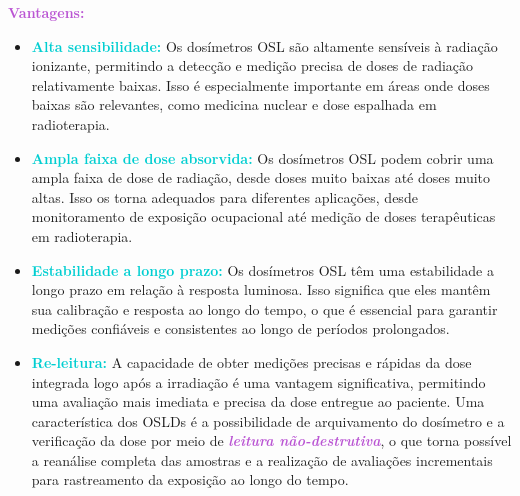 \documentclass[11pt,a4paper]{article}
\begin{document}
	\begin{tcolorbox}[width=\textwidth, colback={white}, colbacktitle={DarkTurquoise!50!white}, title={$\bigstar$ \LobsterTwo{Dosímetros OSL} $\bigstar$}, coltitle={CarnationPink}, colframe={DarkTurquoise}, fonttitle=\rmfamily\bfseries\Large, breakable]

	\textcolor{MediumOrchid}{\Large\LobsterTwo\textbf{Vantagens:}}
	\begin{itemize}[label=\textcolor{CarnationPink}{$\blacktriangleright$}]
		\item \textcolor{DarkTurquoise}{\textbf{Alta sensibilidade:}} Os dosímetros OSL são altamente sensíveis à radiação ionizante, permitindo a detecção e medição precisa de doses de radiação relativamente baixas. Isso é especialmente importante em áreas onde doses baixas são relevantes, como medicina nuclear e dose espalhada em radioterapia.
		\item \textcolor{DarkTurquoise}{\textbf{Ampla faixa de dose absorvida:}} Os dosímetros OSL podem cobrir uma ampla faixa de dose de radiação, desde doses muito baixas até doses muito altas. Isso os torna adequados para diferentes aplicações, desde monitoramento de exposição ocupacional até medição de doses terapêuticas em radioterapia.
		\item \textcolor{DarkTurquoise}{\textbf{Estabilidade a longo prazo:}} Os dosímetros OSL têm uma estabilidade a longo prazo em relação à resposta luminosa. Isso significa que eles mantêm sua calibração e resposta ao longo do tempo, o que é essencial para garantir medições confiáveis e consistentes ao longo de períodos prolongados.
		\item \textcolor{DarkTurquoise}{\textbf{Re-leitura:}} A capacidade de obter medições precisas e rápidas da dose integrada logo após a irradiação é uma vantagem significativa, permitindo uma avaliação mais imediata e precisa da dose entregue ao paciente. Uma característica dos OSLDs é a possibilidade de arquivamento do dosímetro e a verificação da dose por meio de \textcolor{MediumOrchid}{\textit{\textbf{leitura não-destrutiva}}}, o que torna possível a reanálise completa das amostras e a realização de avaliações incrementais para rastreamento da exposição ao longo do tempo.
	\end{itemize}


\end{tcolorbox}
\end{document}
